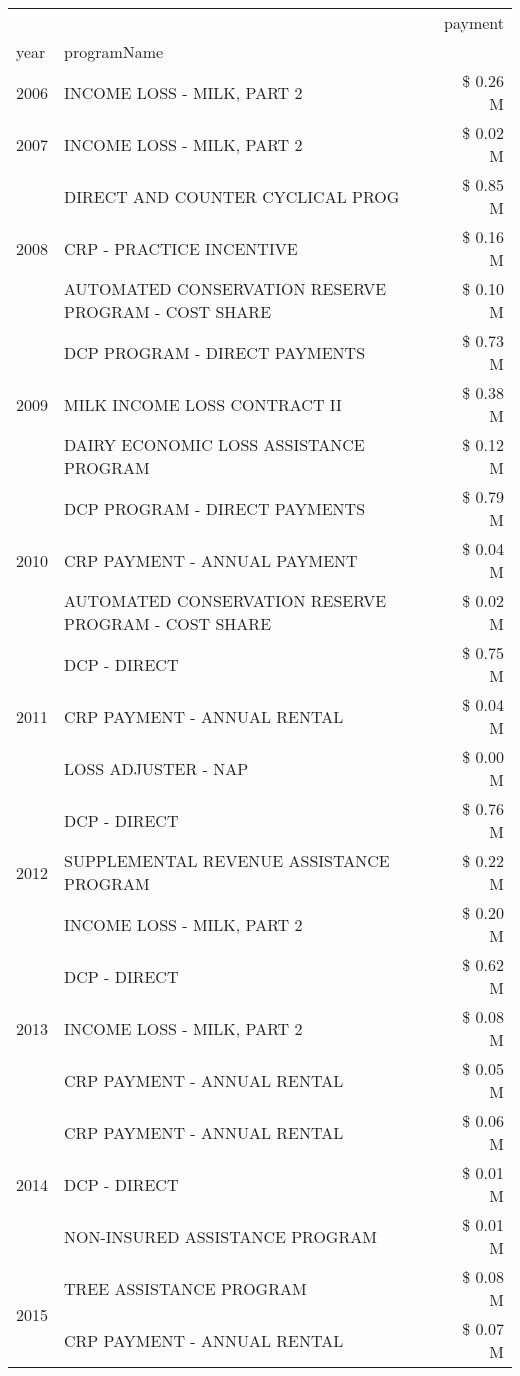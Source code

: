 \begin{tabular}{llr}
\toprule
 &  & payment \\
year & programName &  \\
\midrule
2006 & INCOME LOSS - MILK, PART 2 & \$ 0.26 M \\
\cline{1-3}
2007 & INCOME LOSS - MILK, PART 2 & \$ 0.02 M \\
\cline{1-3}
\multirow[t]{3}{*}{2008} & DIRECT AND COUNTER CYCLICAL PROG & \$ 0.85 M \\
 & CRP - PRACTICE INCENTIVE & \$ 0.16 M \\
 & AUTOMATED CONSERVATION RESERVE PROGRAM - COST SHARE & \$ 0.10 M \\
\cline{1-3}
\multirow[t]{3}{*}{2009} & DCP PROGRAM - DIRECT PAYMENTS & \$ 0.73 M \\
 & MILK INCOME LOSS CONTRACT II & \$ 0.38 M \\
 & DAIRY ECONOMIC LOSS ASSISTANCE PROGRAM & \$ 0.12 M \\
\cline{1-3}
\multirow[t]{3}{*}{2010} & DCP PROGRAM - DIRECT PAYMENTS & \$ 0.79 M \\
 & CRP PAYMENT - ANNUAL PAYMENT & \$ 0.04 M \\
 & AUTOMATED CONSERVATION RESERVE PROGRAM - COST SHARE & \$ 0.02 M \\
\cline{1-3}
\multirow[t]{3}{*}{2011} & DCP - DIRECT & \$ 0.75 M \\
 & CRP PAYMENT - ANNUAL RENTAL & \$ 0.04 M \\
 & LOSS ADJUSTER - NAP & \$ 0.00 M \\
\cline{1-3}
\multirow[t]{3}{*}{2012} & DCP - DIRECT & \$ 0.76 M \\
 & SUPPLEMENTAL REVENUE ASSISTANCE PROGRAM & \$ 0.22 M \\
 & INCOME LOSS - MILK, PART 2 & \$ 0.20 M \\
\cline{1-3}
\multirow[t]{3}{*}{2013} & DCP - DIRECT & \$ 0.62 M \\
 & INCOME LOSS - MILK, PART 2 & \$ 0.08 M \\
 & CRP PAYMENT - ANNUAL RENTAL & \$ 0.05 M \\
\cline{1-3}
\multirow[t]{3}{*}{2014} & CRP PAYMENT - ANNUAL RENTAL & \$ 0.06 M \\
 & DCP - DIRECT & \$ 0.01 M \\
 & NON-INSURED ASSISTANCE PROGRAM & \$ 0.01 M \\
\cline{1-3}
\multirow[t]{3}{*}{2015} & TREE ASSISTANCE PROGRAM & \$ 0.08 M \\
 & CRP PAYMENT - ANNUAL RENTAL & \$ 0.07 M \\

\end{tabular}
